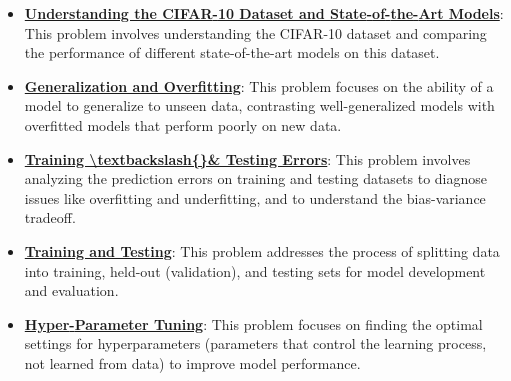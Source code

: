 \documentclass{article}%
\begin{document}
\begin{itemize}[leftmargin=*]
\item \href{https://purdue.brightspace.com/d2l/common/assets/pdfjs-d2l-dist/1.0.14-legacy/web/viewer.html?file=\%2Fcontent\%2Fenforced\%2F1095467-wl.202510.CS.24300.001\%2F09L1-cnn.pdf\%3Fou\%3D1095467\&lang=en-us\&container=d2l-fileviewer-rendered-pdf\&fullscreen=d2l-fileviewer-rendered-pdf-dialog\&height=667#page=23}{\textbf{Understanding the CIFAR{-}10 Dataset and State{-}of{-}the{-}Art Models}}: This problem involves understanding the CIFAR-10 dataset and comparing the performance of different state-of-the-art models on this dataset.%
\end{itemize}%
\begin{itemize}[leftmargin=*]%
\item \href{https://purdue.brightspace.com/d2l/common/assets/pdfjs-d2l-dist/1.0.14-legacy/web/viewer.html?file=\%2Fcontent\%2Fenforced\%2F1095467-wl.202510.CS.24300.001\%2F10L1-CrossValidation.pdf\%3Fou\%3D1095467\&lang=en-us\&container=d2l-fileviewer-rendered-pdf\&fullscreen=d2l-fileviewer-rendered-pdf-dialog\&height=667#page=2}{\textbf{Generalization and Overfitting}}: This problem focuses on the ability of a model to generalize to unseen data, contrasting well-generalized models with overfitted models that perform poorly on new data.%
\item \href{https://purdue.brightspace.com/d2l/common/assets/pdfjs-d2l-dist/1.0.14-legacy/web/viewer.html?file=\%2Fcontent\%2Fenforced\%2F1095467-wl.202510.CS.24300.001\%2F10L1-CrossValidation.pdf\%3Fou\%3D1095467\&lang=en-us\&container=d2l-fileviewer-rendered-pdf\&fullscreen=d2l-fileviewer-rendered-pdf-dialog\&height=667#page=4}{\textbf{Training \textbackslash{}textbackslash\{\}\& Testing Errors}}: This problem involves analyzing the prediction errors on training and testing datasets to diagnose issues like overfitting and underfitting, and to understand the bias-variance tradeoff.%
\item \href{https://purdue.brightspace.com/d2l/common/assets/pdfjs-d2l-dist/1.0.14-legacy/web/viewer.html?file=\%2Fcontent\%2Fenforced\%2F1095467-wl.202510.CS.24300.001\%2F10L1-CrossValidation.pdf\%3Fou\%3D1095467\&lang=en-us\&container=d2l-fileviewer-rendered-pdf\&fullscreen=d2l-fileviewer-rendered-pdf-dialog\&height=667#page=5}{\textbf{Training and Testing}}: This problem addresses the process of splitting data into training, held-out (validation), and testing sets for model development and evaluation.%
\item \href{https://purdue.brightspace.com/d2l/common/assets/pdfjs-d2l-dist/1.0.14-legacy/web/viewer.html?file=\%2Fcontent\%2Fenforced\%2F1095467-wl.202510.CS.24300.001\%2F10L1-CrossValidation.pdf\%3Fou\%3D1095467\&lang=en-us\&container=d2l-fileviewer-rendered-pdf\&fullscreen=d2l-fileviewer-rendered-pdf-dialog\&height=667#page=14}{\textbf{Hyper{-}Parameter Tuning}}: This problem focuses on finding the optimal settings for hyperparameters (parameters that control the learning process, not learned from data) to improve model performance.%

\end{itemize}
\end{document}
